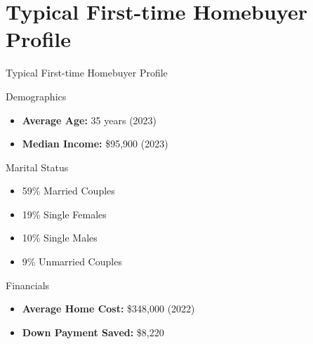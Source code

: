 \documentclass{beamer}
\begin{document}
\section{Typical First-time Homebuyer Profile}
\begin{frame}{Typical First-time Homebuyer Profile}
    \begin{block}{Demographics}
        \begin{itemize}
            \item \textbf{Average Age:} 35 years (2023)
            \item \textbf{Median Income:} \$95,900 (2023)
        \end{itemize}
    \end{block}
    \begin{block}{Marital Status}
        \begin{itemize}
            \item 59\% Married Couples
            \item 19\% Single Females
            \item 10\% Single Males
            \item 9\% Unmarried Couples
        \end{itemize}
    \end{block}
    \begin{block}{Financials}
        \begin{itemize}
            \item \textbf{Average Home Cost:} \$348,000 (2022) 
            \item \textbf{Down Payment Saved:} \$8,220 
        \end{itemize}
    \end{block}
\end{frame}
\end{document}
